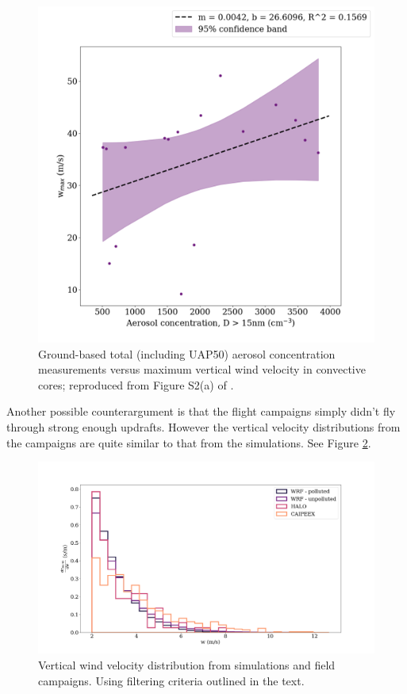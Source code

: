\documentclass{article}
\begin{document}
\begin{figure}[ht]
    \centering
    \includegraphics[width=12cm]{revhalo/v2_FINAL_fan_fig_s2a.png}
    \caption{Ground-based total (including UAP50) aerosol concentration measurements versus maximum vertical wind velocity in convective cores; reproduced from Figure S2(a) of \cite{Fan2018}.}
    \label{fans2a}
\end{figure}

Another possible counterargument is that the flight campaigns simply didn't fly through strong enough updrafts. However the vertical velocity distributions from the campaigns are quite similar to that from the simulations. See Figure \ref{combinedwhist}. 

\begin{figure}[ht]
    \centering
    \includegraphics[width=12cm]{revmywrf/v2_FINAL_combined_w_hist_figure.png}
    \caption{Vertical wind velocity distribution from simulations and field campaigns. Using filtering criteria outlined in the text.}
    \label{combinedwhist}
\end{figure}
\end{document}
